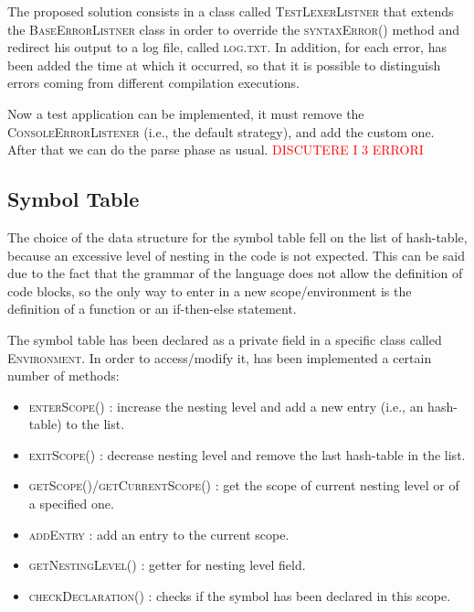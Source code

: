 \documentclass[11pt]{article} %
\newcommand{\ES}{\textcolor{red}}
\begin{document}
The proposed solution consists in a class called \textsc{TestLexerListner} that extends the \textsc{BaseErrorListner} class in order to override the \textsc{syntaxError()} method and redirect his output to a log file, called \textsc{log.txt}. In addition, for each error, has been added the time at which it occurred, so that it is possible to distinguish errors coming from different compilation executions. 

\medskip

Now a test application can be implemented, it must remove the \textsc{ConsoleErrorListener} (i.e., the default strategy), and add the custom one. After that we can do the parse phase as usual.
\ES{DISCUTERE I 3 ERRORI}
%


\subsection{Symbol Table}
The choice of the data structure for the symbol table fell on the list of hash-table, because an excessive level of nesting in the code is not expected. This can be said due to the fact that the grammar of the language does not allow the definition of code blocks, so the only way to enter in a new scope/environment is the definition of a function or an if-then-else statement. 

\medskip

The symbol table has been declared as a private field in a specific class called \textsc{Environment}. In order to access/modify it, has been implemented a certain number of methods:
\begin{itemize}
\item \textsc{enterScope()} : increase the nesting level and add a new entry (i.e., an hash-table) to the list. 
\item \textsc{exitScope()} : decrease nesting level and remove the last hash-table in the list.
\item \textsc{getScope()}/\textsc{getCurrentScope()} : get the scope of current nesting level or of a specified one.
\item \textsc{addEntry} : add an entry to the current scope.
\item \textsc{getNestingLevel()} : getter for nesting level field.
\item \textsc{checkDeclaration()} : checks if the symbol has been declared in this scope. 
\end{itemize}

\medskip
\end{document}
